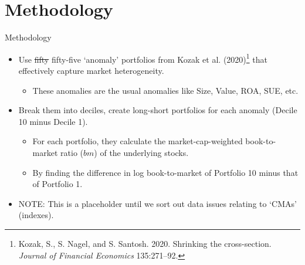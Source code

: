 \documentclass[dvipsnames,mathserif, handout]{beamer}
\begin{document}
{\section{Methodology}


\begin{frame}{Methodology}
	\begin{itemize}
		\item Use \sout{fifty} fifty-five `anomaly' portfolios from Kozak et al. (2020)\footnote{\tiny Kozak, S., S. Nagel, and S. Santosh. 2020. Shrinking the cross-section. \textit{Journal of Financial Economics} 135:271–92.} that effectively capture market heterogeneity.
		\begin{itemize}
			\item These anomalies are the usual anomalies like Size, Value, ROA, SUE, etc.
		\end{itemize}
		\item Break them into deciles, create long-short portfolios for each anomaly (Decile 10 minus Decile 1).
		\begin{itemize}
			\item For each portfolio, they calculate the market-cap-weighted book-to-market ratio ($bm$) of the underlying stocks.
			\item By finding the difference in log book-to-market of Portfolio 10 minus that of Portfolio 1.
		\end{itemize}
		\item NOTE: This is a placeholder until we sort out data issues relating to `CMAs' (indexes).
	\end{itemize}
\end{frame}


}
\end{document}
